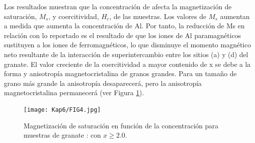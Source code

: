 Los resultados muestran que la concentración de  afecta la magnetización de
saturación, $M_s$, y coercitividad, $H_c$, de las muestras. Los valores de
$M_s$
aumentan a medida que aumenta la concentración de Al. Por tanto, la reducción
de Ms en relación con lo reportado es el resultado de que los iones de Al
paramagnéticos sustituyen a los iones de  ferromagnéticos, lo que disminuye
el momento magnético neto resultante de la interacción de superintercambio
entre los sitios (a) y (d) del granate. El valor creciente de la coercitividad
a mayor contenido de x se debe a la forma y anisotropía magnetocristalina de
granos grandes. Para un tamaño de grano más grande la anisotropía desaparecerá,
pero la anisotropía magnetocristalina permanecerá \cite{hapishah2017phase} (ver Figura
\ref{fig:mr}).\\

\begin{figure}[t]
  \centering%

  \texttt{[image: Kap6/FIG4.jpg]}%
  \caption{Magnetización de saturación en función de la concentración para muestras de granate : con $x \geq 2.0$.}
  \label{fig:mr}
\end{figure}
